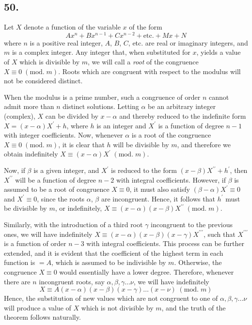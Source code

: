 \documentclass[twoside,12pt]{memoir}
\renewcommand{\pmod}[1]{\;(\textrm{mod.}\;#1)}
\begin{document}
\subsection*{50.}

Let \(X\) denote a function of the variable \(x\) of the form
\[A x^{n}+B x^{n-1}+C x^{n-2}+\text{etc{.}}+M x+N\]\pagebreak%
where \(n\) is a positive real integer, \(A\), \(B\), \(C\), etc{.} are real or imaginary integers, and \(m\) is a complex integer.  Any integer that, when substituted for \(x\), yields a value of \(X\) which is divisible by \(m\), we will call a \textit{root} of the congruence \(X \equiv 0\pmod{m}\). Roots which are congruent with respect to the modulus will not be considered distinct.

When the modulus is a prime number, such a congruence of order \(n\) cannot admit more than \(n\) distinct solutions. Letting \(\alpha\) be an arbitrary integer (complex), \(X\) can be divided by \(x-\alpha\) and thereby reduced to the indefinite form \(X=(x-\alpha) X^{\prime}+h\), where \(h\) is an integer and \(X^{\prime}\) is a function of degree \(n-1\) with integer coefficients. Now, whenever \(\alpha\) is a root of the congruence \(X \equiv 0\pmod{m}\), it is clear that \(h\) will be divisible by \(m\), and therefore we obtain indefinitely \(X \equiv(x-\alpha) X^{\prime}\pmod{m}\).

Now, if \(\beta\) is a given integer, and \(X^{\prime}\) is reduced to the form \((x-\beta) X^{\prime \prime}+h^{\prime}\), then \(X^{\prime \prime}\) will be a function of degree \(n-2\) with integral coefficients. However, if \(\beta\) is assumed to be a root of congruence \({X} \equiv 0\), it must also satisfy \((\beta-\alpha) X^{\prime} \equiv 0\) and \(X^{\prime} \equiv 0\), since the roots \(\alpha\), \(\beta\) are incongruent. Hence, it follows that \(h^{\prime}\) must be divisible by \(m\), or indefinitely, \(X \equiv(x-\alpha)(x-\beta) X^{\prime \prime}\pmod{m}\).

Similarly, with the introduction of a third root \(\gamma\) incongruent to the previous ones, we will have indefinitely \(X \equiv(x-\alpha)(x-\beta)(x-\gamma) X^{\prime \prime \prime}\), such that \(X^{\prime \prime \prime}\) is a function of order \(n-3\) with integral coefficients. This process can be further extended, and it is evident that the coefficient of the highest term in each function is \(=A\), which is assumed to be indivisible by \(m\). Otherwise, the congruence \(X \equiv 0\) would essentially have a lower degree. Therefore, whenever there are \(n\) incongruent roots, say \(\alpha, \beta, \gamma \ldots \nu\), we will have indefinitely
\[X \equiv A(x-\alpha)(x-\beta)(x-\gamma) \ldots(x-\nu)\pmod{m}\]
Hence, the substitution of new values which are not congruent to one of \(\alpha, \beta, \gamma \ldots \nu\) will produce a value of \(X\) which is not divisible by \(m\), and the truth of the theorem follows naturally.
\end{document}
